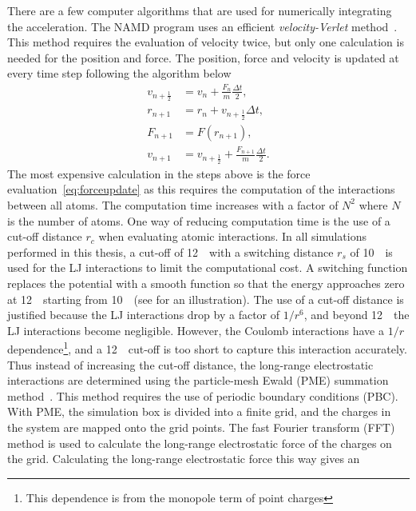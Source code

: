 There are a few computer algorithms that are used for numerically integrating the acceleration. 
The NAMD program uses an efficient {\it velocity-Verlet} method~\cite{Swope1982}. This method 
requires the evaluation of velocity twice, but only one calculation is needed for the position and 
force. The position, force and velocity is updated at every time step following the algorithm below
\begin{subequations}
\begin{align}
v_{n+\frac{1}{2}} &= v_{n} + \frac{F_{n}}{m}\frac{\Delta t}{2}, \\
r_{n+1} &= r_{n} + v_{n+\frac{1}{2}}\Delta t, \\
F_{n+1} &= F(r_{n+1}), \label{eq:forceupdate} \\
v_{n+1} &= v_{n+\frac{1}{2}}+\frac{F_{n+1}}{m}\frac{\Delta t}{2}.
\end{align}
\end{subequations}
The most expensive calculation in the steps above is the force evaluation~\eqref{eq:forceupdate} 
as this requires the computation of the interactions between all atoms. The computation time 
increases with a factor of $N^2$ where $N$ is the number of atoms. One way of reducing 
computation time is the use of a cut-off distance $r_{c}$ when evaluating atomic interactions. 
In all simulations performed in this thesis, a cut-off of 12~\angs\ with a switching distance 
$r_{s}$ of 10~\angs\ is used for the LJ interactions to limit the computational cost. A 
switching function replaces the potential with a smooth function so that the energy approaches 
zero at 12~\angs\ starting from 10~\angs\ (see  for an illustration). 
The use of a cut-off distance is justified because the LJ interactions drop by a factor of 
$1/r^6$, and beyond 12~\angs\ the LJ interactions become negligible. However, the Coulomb 
interactions have a $1/r$ dependence\footnote{This dependence is from the monopole term of 
point charges}, and a 12~\angs\ cut-off is too short to capture this interaction accurately. 
Thus instead of increasing the cut-off distance, the long-range electrostatic interactions are 
determined using the particle-mesh Ewald (PME) summation method~\cite{Darden1993}. This method 
requires the use of periodic boundary conditions (PBC). With PME, the simulation box is divided 
into a finite grid, and the charges in the system are mapped onto the grid points. The fast 
Fourier transform (FFT) method is used to calculate the long-range electrostatic force of the 
charges on the grid. Calculating the long-range electrostatic force this way gives an 
